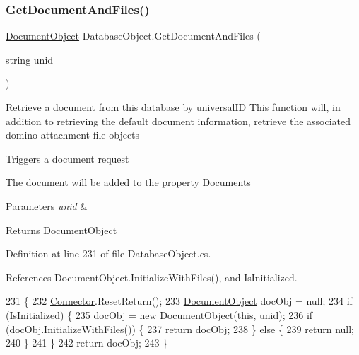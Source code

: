 \subsubsection{\texorpdfstring{Get\+Document\+And\+Files()}{GetDocumentAndFiles()}}
{\footnotesize\ttfamily \mbox{\hyperlink{class_document_object}{Document\+Object}} Database\+Object.\+Get\+Document\+And\+Files (\begin{DoxyParamCaption}\item[{string}]{unid }\end{DoxyParamCaption})}



Retrieve a document from this database by universal\+ID This function will, in addition to retrieving the default document information, retrieve the associated domino attachment file objects 

Triggers a document request

The document will be added to the property \textquotesingle{}Documents\textquotesingle{}


\begin{DoxyParams}{Parameters}
{\em unid} & \\
\hline
\end{DoxyParams}
\begin{DoxyReturn}{Returns}
\mbox{\hyperlink{class_document_object}{Document\+Object}}
\end{DoxyReturn}


Definition at line 231 of file Database\+Object.\+cs.



References Document\+Object.\+Initialize\+With\+Files(), and Is\+Initialized.


\begin{DoxyCode}
231                                                            \{
232         \mbox{\hyperlink{class_connector}{Connector}}.ResetReturn();
233         \mbox{\hyperlink{class_document_object}{DocumentObject}} docObj = null;
234         \textcolor{keywordflow}{if} (\mbox{\hyperlink{class_database_object_a5fe036d32a30eb10d1b3f6a30263f740}{IsInitialized}}) \{
235             docObj = \textcolor{keyword}{new} \mbox{\hyperlink{class_document_object}{DocumentObject}}(\textcolor{keyword}{this}, unid);
236             \textcolor{keywordflow}{if} (docObj.\mbox{\hyperlink{class_document_object_a83f0e855adc5fb7afd02d2e34767f5c8}{InitializeWithFiles}}()) \{
237                 \textcolor{keywordflow}{return} docObj;
238             \} \textcolor{keywordflow}{else} \{
239                 \textcolor{keywordflow}{return} null;
240             \}
241         \}
242         \textcolor{keywordflow}{return} docObj;
243     \}
\end{DoxyCode}
\mbox{\label{class_database_object_a1d35f51baee4be6adb69a954efe5b4bf}} 
